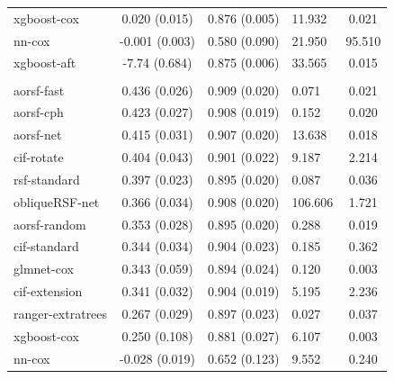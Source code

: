 \documentclass[twoside,11pt]{article}\usepackage[]{graphicx}\usepackage[]{xcolor}
\newenvironment{knitrout}{}{} %
\begin{document}
\begin{knitrout}
\begin{longtable}[t]{lcclc}
\hspace{1em}xgboost-cox & 0.020 (0.015) & 0.876 (0.005) & 11.932 & 0.021\\
\hspace{1em}nn-cox & -0.001 (0.003) & 0.580 (0.090) & 21.950 & 95.510\\
\hspace{1em}xgboost-aft & -7.74 (0.684) & 0.875 (0.006) & 33.565 & 0.015\\
\addlinespace[0.3em]
\hline
\multicolumn{5}{l}{\textit{\textbf{Primary biliary cholangitis; death, n = 276, p = 19}}}\\
\hline
\hspace{1em}aorsf-fast & 0.436 (0.026) & 0.909 (0.020) & 0.071 & 0.021\\
\hspace{1em}aorsf-cph & 0.423 (0.027) & 0.908 (0.019) & 0.152 & 0.020\\
\hspace{1em}aorsf-net & 0.415 (0.031) & 0.907 (0.020) & 13.638 & 0.018\\
\hspace{1em}cif-rotate & 0.404 (0.043) & 0.901 (0.022) & 9.187 & 2.214\\
\hspace{1em}rsf-standard & 0.397 (0.023) & 0.895 (0.020) & 0.087 & 0.036\\
\hspace{1em}obliqueRSF-net & 0.366 (0.034) & 0.908 (0.020) & 106.606 & 1.721\\
\hspace{1em}aorsf-random & 0.353 (0.028) & 0.895 (0.020) & 0.288 & 0.019\\
\hspace{1em}cif-standard & 0.344 (0.034) & 0.904 (0.023) & 0.185 & 0.362\\
\hspace{1em}glmnet-cox & 0.343 (0.059) & 0.894 (0.024) & 0.120 & 0.003\\
\hspace{1em}cif-extension & 0.341 (0.032) & 0.904 (0.019) & 5.195 & 2.236\\
\hspace{1em}ranger-extratrees & 0.267 (0.029) & 0.897 (0.023) & 0.027 & 0.037\\
\hspace{1em}xgboost-cox & 0.250 (0.108) & 0.881 (0.027) & 6.107 & 0.003\\
\hspace{1em}nn-cox & -0.028 (0.019) & 0.652 (0.123) & 9.552 & 0.240\\

\end{longtable}
\end{knitrout}
\end{document}
